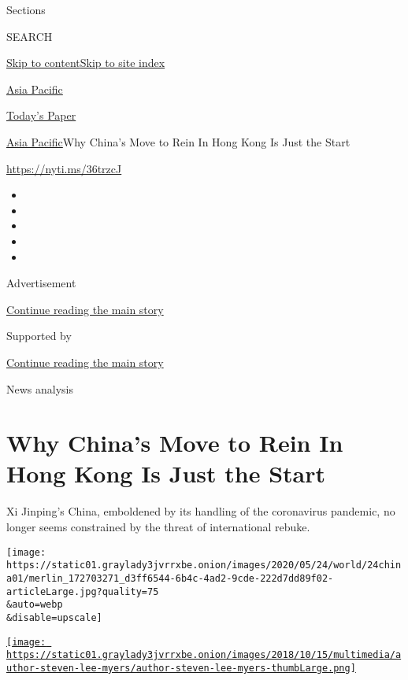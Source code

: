 Sections

SEARCH

\protect\hyperlink{site-content}{Skip to
content}\protect\hyperlink{site-index}{Skip to site index}

\href{https://www.nytimes3xbfgragh.onion/section/world/asia}{Asia
Pacific}

\href{https://myaccount.nytimes3xbfgragh.onion/auth/login?response_type=cookie\&client_id=vi}{}

\href{https://www.nytimes3xbfgragh.onion/section/todayspaper}{Today's
Paper}

\href{/section/world/asia}{Asia Pacific}\textbar{}Why China's Move to
Rein In Hong Kong Is Just the Start

\url{https://nyti.ms/36trzcJ}

\begin{itemize}
\item
\item
\item
\item
\item
\end{itemize}

Advertisement

\protect\hyperlink{after-top}{Continue reading the main story}

Supported by

\protect\hyperlink{after-sponsor}{Continue reading the main story}

News analysis

\hypertarget{why-chinas-move-to-rein-in-hong-kong-is-just-the-start}{%
\section{Why China's Move to Rein In Hong Kong Is Just the
Start}\label{why-chinas-move-to-rein-in-hong-kong-is-just-the-start}}

Xi Jinping's China, emboldened by its handling of the coronavirus
pandemic, no longer seems constrained by the threat of international
rebuke.

\texttt{[image: https://static01.graylady3jvrrxbe.onion/images/2020/05/24/world/24china01/merlin\_172703271\_d3ff6544-6b4c-4ad2-9cde-222d7dd89f02-articleLarge.jpg?quality=75\\\&auto=webp\\\&disable=upscale]}

\href{https://www.nytimes3xbfgragh.onion/by/steven-lee-myers}{\texttt{[image: https://static01.graylady3jvrrxbe.onion/images/2018/10/15/multimedia/author-steven-lee-myers/author-steven-lee-myers-thumbLarge.png]}}

